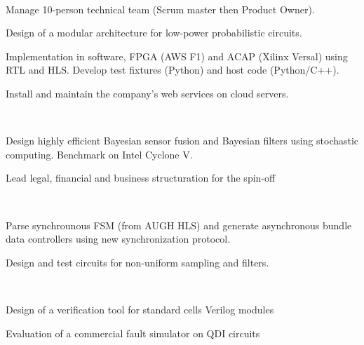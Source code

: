 \documentclass[a4paper]{MagicalCV}
\begin{document}
\begin{minipage}[t]{0.66\textwidth} 


 \\
\begin{tightemize}
\item Manage 10-person technical team (Scrum master then Product Owner).
\item Design of a modular architecture for low-power probabilistic circuits.
\item Implementation in software, FPGA (AWS F1) and ACAP (Xilinx Versal)
  using RTL and HLS. Develop test fixtures (Python) and host code (Python/C++).
\item Install and maintain the company's web services on cloud servers.
\end{tightemize}
\sectionsep

 \\
\begin{tightemize}
\item Design highly efficient Bayesian sensor fusion and Bayesian filters
  using stochastic computing. Benchmark on Intel Cyclone V.
\item Lead legal, financial and business structuration for the spin-off
\end{tightemize}
\sectionsep

 \\
\vspace{\topsep} %
\begin{tightemize}
\item Parse synchrounous FSM (from AUGH HLS) and generate asynchronous bundle data
  controllers using new synchronization protocol.
\item Design and test circuits for non-uniform sampling and filters. 
\end{tightemize}
\sectionsep

 \\
\vspace{\topsep} %
\begin{tightemize}
\item Design of a verification tool for standard cells Verilog modules
\item Evaluation of a commercial fault simulator on QDI circuits
\end{tightemize}
\sectionsep


\end{minipage}
\end{document}
